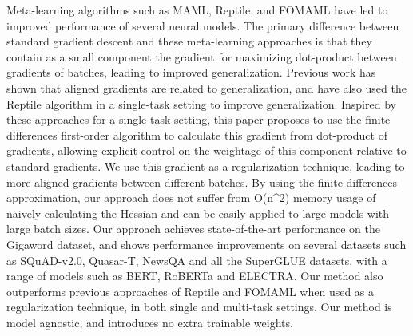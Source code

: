 Meta-learning algorithms such as MAML, Reptile, and FOMAML have led to improved performance of several neural models. The primary difference between standard gradient descent and these meta-learning approaches is that they contain as a small component the gradient for maximizing dot-product between gradients of batches, leading to improved generalization. Previous work has shown that aligned gradients are related to generalization, and have also used the Reptile algorithm in a single-task setting to improve generalization. Inspired by these approaches for a single task setting, this paper proposes to use the finite differences first-order algorithm to calculate this gradient from dot-product of gradients, allowing explicit control on the weightage of this component relative to standard gradients. We use this gradient as a regularization technique, leading to more aligned gradients between different batches. By using the finite differences approximation, our approach does not suffer from O(n^2) memory usage of naively calculating the Hessian and can be easily applied to large models with large batch sizes. Our approach achieves state-of-the-art performance on the Gigaword dataset, and shows performance improvements on several datasets such as SQuAD-v2.0, Quasar-T, NewsQA and all the SuperGLUE datasets, with a range of models such as BERT, RoBERTa and ELECTRA. Our method also outperforms previous approaches of Reptile and FOMAML when used as a regularization technique, in both single and multi-task settings. Our method is model agnostic, and introduces no extra trainable weights.

